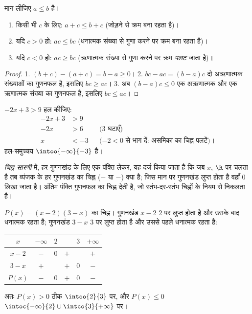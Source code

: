 \begin{proposition}[असमिकाओं के नियम]\label{prop:g10:algebra:ineqrules}
मान लीजिए $a \leq b$ है।
\begin{enumerate}
  \item किसी भी $c$ के लिए: $a + c \leq b + c$ (जोड़ने से क्रम बना रहता है)।
  \item यदि $c > 0$ हो: $ac \leq bc$ (धनात्मक संख्या से गुणा करने पर क्रम बना रहता
        है)।
  \item यदि $c < 0$ हो: $ac \geq bc$ (ऋणात्मक संख्या से गुणा करने पर क्रम
        \emph{पलट} जाता है)।
\end{enumerate}
\end{proposition}

\begin{proof}
1. $(b + c) - (a + c) = b - a \geq 0$।
2. $bc - ac = (b-a)c$ दो अऋणात्मक संख्याओं का गुणनफल है, इसलिए $bc \geq ac$।
3. अब $(b-a)c \leq 0$ एक अऋणात्मक और एक ऋणात्मक संख्या का गुणनफल है, इसलिए $bc \leq ac$।
\end{proof}

\begin{example}\label{ex:g10:algebra:firstineq}
$-2x + 3 > 9$ हल कीजिए:
\begin{align*}
-2x + 3 &> 9 \\
-2x &> 6 && \text{($3$ घटाएँ)} \\
x &< -3 && \text{($-2 < 0$ से भाग दें: असमिका का चिह्न पलटें)।}
\end{align*}
हल-समुच्चय $\intoo{-\infty}{-3}$ है।
\end{example}

\begin{definition}[चिह्न-सारणी]\label{def:g10:algebra:signtable}
\emph{चिह्न-सारणी} में, हर गुणनखंड के लिए एक पंक्ति
लेकर, यह दर्ज किया जाता है कि जब $x$, $\R$ पर चलता है तब व्यंजक के हर
गुणनखंड का चिह्न ($+$ या $-$) क्या है; जिस मान पर गुणनखंड लुप्त होता है
वहाँ $0$ लिखा जाता है। अंतिम पंक्ति गुणनफल का चिह्न देती है, जो स्तंभ-दर-स्तंभ
चिह्नों के नियम से निकलता है।
\end{definition}

\begin{example}\label{ex:g10:algebra:signtable}
$P(x) = (x - 2)(3 - x)$ का चिह्न। गुणनखंड $x - 2$ $2$ पर लुप्त होता है और उसके बाद धनात्मक
रहता है; गुणनखंड $3 - x$ $3$ पर लुप्त होता है और उससे पहले धनात्मक रहता है:
\begin{center}
\renewcommand{\arraystretch}{1.3}
\begin{tabular}{c|ccccc}
$x$ & $-\infty$ \quad & $2$ & & $3$ & \quad $+\infty$ \\
\hline
$x - 2$ & $-$ & $0$ & $+$ & & $+$ \\
$3 - x$ & $+$ & & $+$ & $0$ & $-$ \\
\hline
$P(x)$ & $-$ & $0$ & $+$ & $0$ & $-$ \\
\end{tabular}
\end{center}
अतः $P(x) > 0$ ठीक $\intoo{2}{3}$ पर, और $P(x) \leq 0$ $\intoc{-\infty}{2} \cup \intco{3}{+\infty}$ पर।
\end{example}

